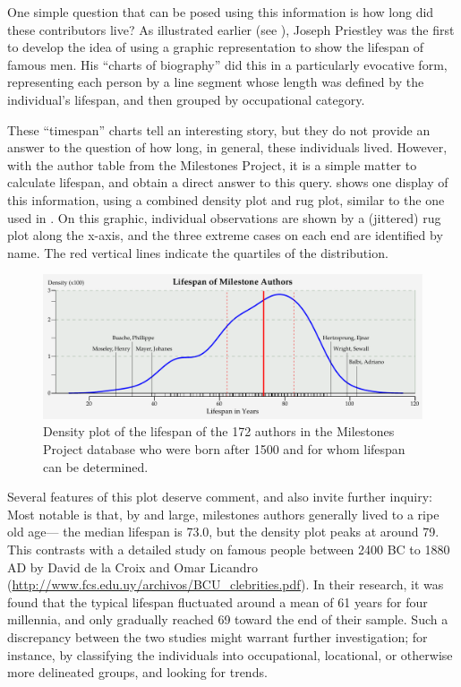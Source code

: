 One simple question that can be posed using this information is how long did these contributors live? As illustrated earlier (see ), Joseph Priestley was the first to develop the idea of using a graphic representation to show the lifespan of famous men. His ``charts of biography'' did this in a particularly evocative form, representing each person by a line segment whose length was defined by the individual's lifespan, and then grouped by occupational category.

These ``timespan'' charts tell an interesting story, but they do not provide an answer to the question of how long, in general, these individuals lived.  However, with the author table from the Milestones Project, it is a simple matter to calculate lifespan, and obtain a direct answer to this query.  shows one display of this information, using a combined density plot and rug plot, similar to the one used in . On this graphic, individual observations are shown by a (jittered) rug plot along the x-axis, and the three extreme cases on each end are identified by name.  The red vertical lines indicate the quartiles of the distribution.

\begin{figure}[!htb]
  \centering
  \includegraphics[width=\textwidth,clip]{fig/lifespan3}
  \caption{Density plot of the lifespan of the 172 authors in the Milestones Project database who were born after 1500 and for whom lifespan can be determined.}
  \label{fig:lifespan}
\end{figure}

Several features of this plot deserve comment, and also invite further inquiry: Most notable is that, by and large, milestones authors generally lived to a ripe old age--- the median lifespan is 73.0, but the density plot peaks at around 79. This contrasts with a detailed study on famous people between 2400 BC to 1880 AD by David de la Croix and Omar Licandro (\url{http://www.fcs.edu.uy/archivos/BCU_clebrities.pdf}).  In their research, it was found that the typical lifespan fluctuated around a mean of 61 years for four millennia, and only gradually reached 69 toward the end of their sample. Such a discrepancy between the two studies might warrant further investigation; for instance, by classifying the individuals into occupational, locational, or otherwise more delineated groups, and looking for trends.

